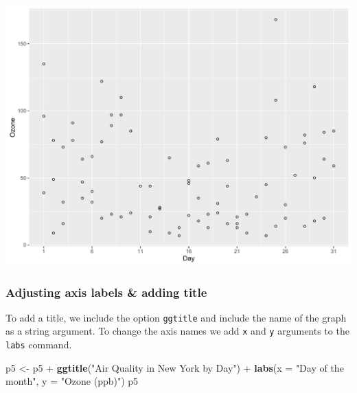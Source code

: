 \documentclass[]{article}
\newenvironment{Shaded}{\begin{snugshade}}{\end{snugshade}}
\newcommand{\KeywordTok}[1]{\textcolor[rgb]{0.13,0.29,0.53}{\textbf{{#1}}}}
\newcommand{\DataTypeTok}[1]{\textcolor[rgb]{0.13,0.29,0.53}{{#1}}}
\newcommand{\StringTok}[1]{\textcolor[rgb]{0.31,0.60,0.02}{{#1}}}
\newcommand{\NormalTok}[1]{{#1}}
\begin{document}
\begin{center}\includegraphics{0_all_posts_pdf/scatter_3-1} \end{center}

\subsubsection{Adjusting axis labels \& adding
title}\label{adjusting-axis-labels-adding-title-3}

To add a title, we include the option \texttt{ggtitle} and include the
name of the graph as a string argument. To change the axis names we add
\texttt{x} and \texttt{y} arguments to the \texttt{labs} command.

\begin{Shaded}
\begin{Highlighting}[]
\NormalTok{p5 <-}\StringTok{ }\NormalTok{p5 +}\StringTok{ }\KeywordTok{ggtitle}\NormalTok{(}\StringTok{"Air Quality in New York by Day"}\NormalTok{) +}\StringTok{ }
\StringTok{      }\KeywordTok{labs}\NormalTok{(}\DataTypeTok{x =} \StringTok{"Day of the month"}\NormalTok{, }\DataTypeTok{y =} \StringTok{"Ozone (ppb)"}\NormalTok{) }
\NormalTok{p5}
\end{Highlighting}
\end{Shaded}
\end{document}
